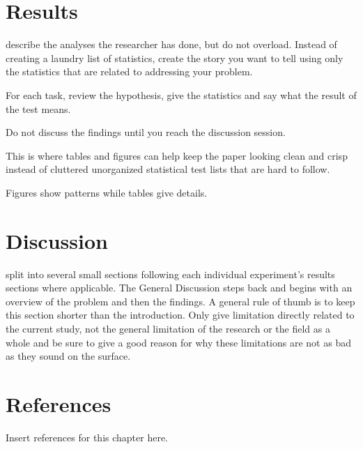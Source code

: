 
\section{Results}

describe the analyses the researcher has done, but do not overload. Instead of creating a laundry list of statistics, create the story you want to tell using only the statistics that are related to addressing your problem. 

For each task, review the hypothesis, give the statistics and say what the result of the test means. 

Do not discuss the findings until you reach the discussion session. 

This is where tables and figures can help keep the paper looking clean and crisp instead of cluttered unorganized statistical test lists that are hard to follow. 

Figures show patterns while tables give details.



\section{Discussion}

split into several small sections following each individual experiment’s results sections where applicable. 
The General Discussion steps back and begins with an overview of the problem and then the findings. A general rule of thumb is to keep this section shorter than the introduction. Only give limitation directly related to the current study, not the general limitation of the research or the field as a whole and be sure to give a good reason for why these limitations are not as bad as they sound on the surface.



\section{References}

Insert references for this chapter here.